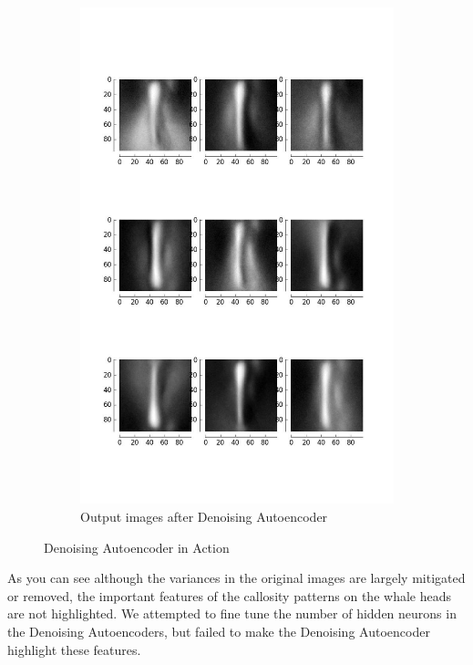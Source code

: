 \begin{figure}[H]
\begin{subfigure}[b]{0.45\linewidth}
		\includegraphics[width=\linewidth]{sections/imgs/preprocessing/denoising_autoencoder_2.png}
		\caption{Output images after Denoising Autoencoder}
		\label{fig:ouput_denoising_autoencoder}
	\end{subfigure}
	
	\caption{Denoising Autoencoder in Action}
	\label{fig:denoising_autoencoder}
\end{figure}

As you can see although the variances in the original images are largely mitigated or removed, the important features of the callosity patterns on the whale heads are not highlighted. We attempted to fine tune the number of hidden neurons in the Denoising Autoencoders, but failed to make the Denoising Autoencoder highlight these features.




